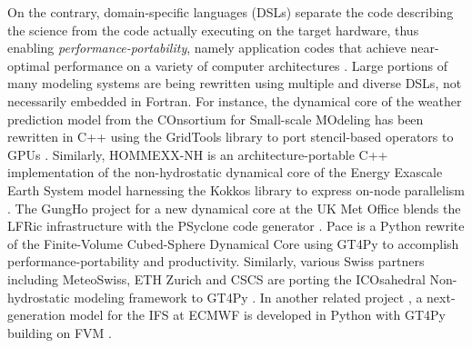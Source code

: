 \documentclass[gmd,manuscript,online]{copernicus}
\theoremstyle{theorem}
\theoremstyle{definition}
\theoremstyle{remark}
\theoremstyle{proposition}
\providecommand{\DIFadd}[1]{{\protect\color{blue}\uwave{#1}}} %
\providecommand{\DIFaddbegin}{} %
\providecommand{\DIFaddend}{} %
\newcommand{\DIFaddincludegraphics}[2][]{{\color{blue}\fbox{\DIFOincludegraphics[#1]{#2}}}} %
\DeclareRobustCommand{\DIFaddbegin}{\DIFOaddbegin \let\includegraphics\DIFaddincludegraphics} %
\DeclareRobustCommand{\DIFaddend}{\DIFOaddend \let\includegraphics\DIFOincludegraphics} %
\begin{document}
	On the contrary, domain-specific languages (DSLs) separate the code describing the science from the code actually executing on the target hardware, thus enabling \emph{performance-portability}, namely application codes that achieve near-optimal performance on a variety of computer architectures \citep{deakin19}. Large portions of many modeling systems are being rewritten using multiple and diverse DSLs, not necessarily embedded in Fortran. For instance, the dynamical core of the weather prediction model from the COnsortium for Small-scale MOdeling \citep[COSMO;][]{baldauf11} has been rewritten in C++ using the GridTools library \citep{afanasyev21} to port stencil-based operators to GPUs \citep{fuhrer14, fuhrer18}. Similarly, HOMMEXX-NH \citep{bertagna20} is an architecture-portable C++ implementation of the non-hydrostatic dynamical core of the Energy Exascale Earth System model \citep[E3SM;][]{taylor20} harnessing the Kokkos library to express on-node parallelism \citep{edwards14}. The GungHo project for a new dynamical core at the UK Met Office \DIFaddbegin \DIFadd{\mbox{%
\citep{melvin19, melvin24} }\hskip0pt%
}\DIFaddend blends the LFRic infrastructure with the PSyclone code generator \citep{adams19}. Pace \citep{ben-nun22, dahm23} is a Python rewrite of the Finite-Volume Cubed-Sphere Dynamical Core \citep[FV3;][]{harris13} using GT4Py to accomplish performance-portability and productivity. Similarly, various Swiss partners including MeteoSwiss, ETH Zurich and CSCS are porting the ICOsahedral Non-hydrostatic modeling framework \citep[ICON;][]{zangl15} to GT4Py \citep{luz24}. In another related project \citep{kuhnlein23}, a next-generation model for the IFS at ECMWF is developed in Python with GT4Py building on FVM \citep{smolarkiewicz16, kuehnlein19}.
\end{document}
